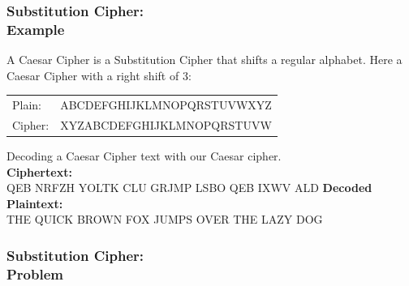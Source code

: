 \documentclass{uva-inf-presentation}
\begin{document}
\begin{frame}
\frametitle{Substitution Cipher:\\ Example}
A Caesar Cipher is a Substitution Cipher that shifts a regular alphabet.
Here a Caesar Cipher with a right shift of 3:\\
\begin{table}
    \begin{tabular}{lc}
        Plain:  & ABCDEFGHIJKLMNOPQRSTUVWXYZ\\
        Cipher: & XYZABCDEFGHIJKLMNOPQRSTUVW
    \end{tabular}
\end{table}

Decoding a Caesar Cipher text with our Caesar cipher.\\
\textbf{Ciphertext:}\\
\hspace{4ex}QEB NRFZH YOLTK CLU GRJMP LSBO QEB IXWV ALD
\textbf{Decoded Plaintext:}\\
\hspace{4ex}THE QUICK BROWN FOX JUMPS OVER THE LAZY DOG
\end{frame}

\begin{frame}
\frametitle{Substitution Cipher:\\ Problem}
\vspace{-20pt}


\end{frame}
\end{document}
